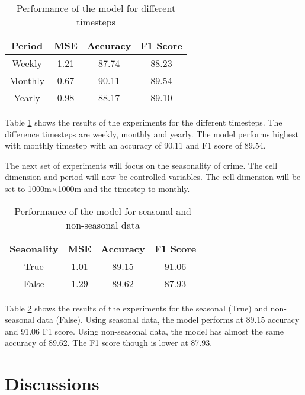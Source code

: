     \begin{table}[H]
      \centering
      \begin{tabular}{|c|c|c|c|}
            \hline
          \textbf{Period}  &\textbf{MSE}  &\textbf{Accuracy} &\textbf{F1 Score}\\ 
          \hline
          Weekly &1.21 &87.74 &88.23 \\
          Monthly &0.67 &90.11 &89.54 \\
          Yearly   &0.98 &88.17 &89.10 \\
          \hline
        \end{tabular}
      \caption{Performance of the model for different timesteps}
      \label{table:timestep-results}
    \end{table}
    Table \ref{table:timestep-results} shows the results of the experiments for the different timesteps. The difference timesteps are weekly, monthly and yearly. The model performs highest with monthly timestep with an accuracy of 90.11 and F1 score of 89.54.

    The next set of experiments will focus on the seasonality of crime. The cell dimension and period will now be controlled variables. The cell dimension will be set to 1000m\(\times\)1000m and the timestep to monthly.

    \begin{table}[H]
      \centering
      \begin{tabular}{|c|c|c|c|}
            \hline
          \textbf{Seaonality}  &\textbf{MSE}  &\textbf{Accuracy} &\textbf{F1 Score}\\ 
          \hline
          True &1.01 &89.15 &91.06\\
          False  &1.29 &89.62 &87.93 \\
          \hline
        \end{tabular}
      \caption{Performance of the model for seasonal and non-seasonal data}
      \label{table:seasonal-results}
    \end{table}
    Table \ref{table:seasonal-results} shows the results of the experiments for the seasonal (True) and non-seasonal data (False). Using seasonal data, the model performs at 89.15 accuracy and 91.06 F1 score. Using non-seasonal data, the model has almost the same accuracy of 89.62. The F1 score though is lower at 87.93.

\section{Discussions}

